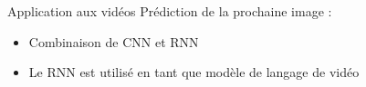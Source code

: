\begin{frame}{Application aux vidéos}
  Prédiction de la prochaine image :
  \begin{itemize}
    \item Combinaison de CNN et RNN
    \item Le RNN est utilisé en tant que modèle de langage de vidéo
  \end{itemize}
\end{frame}
